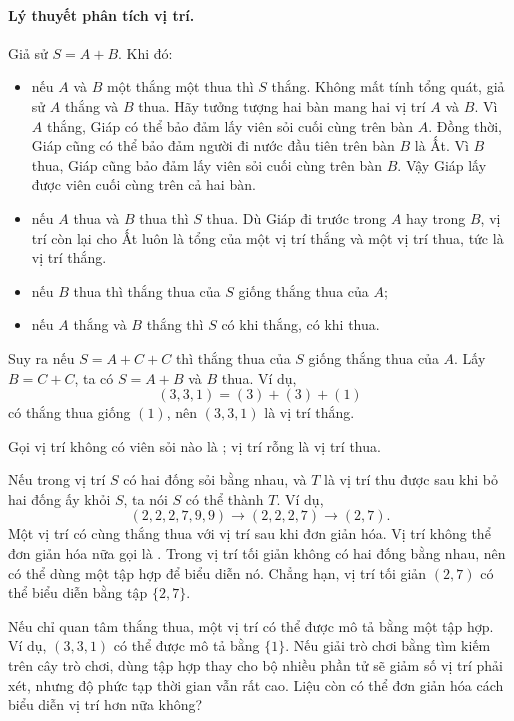 \documentclass[11pt]{article}
\begin{document}
\paragraph{Lý thuyết phân tích vị trí.}
Giả sử \(S=A+B\). Khi đó:
\begin{itemize}
  \item nếu \(A\) và \(B\) một thắng một thua thì \(S\) thắng. Không mất tính
  tổng quát, giả sử \(A\) thắng và \(B\) thua. Hãy tưởng tượng hai bàn mang
  hai vị trí \(A\) và \(B\). Vì \(A\) thắng, Giáp có thể bảo đảm lấy viên sỏi
  cuối cùng trên bàn \(A\). Đồng thời, Giáp cũng có thể bảo đảm người đi
  nước đầu tiên trên bàn \(B\) là Ất. Vì \(B\) thua, Giáp cũng bảo đảm lấy
  viên sỏi cuối cùng trên bàn \(B\). Vậy Giáp lấy được viên cuối cùng trên
  cả hai bàn.

  \item nếu \(A\) thua và \(B\) thua thì \(S\) thua. Dù Giáp đi trước trong
  \(A\) hay trong \(B\), vị trí còn lại cho Ất luôn là tổng của một vị trí
  thắng và một vị trí thua, tức là vị trí thắng.

  \item nếu \(B\) thua thì thắng thua của \(S\) giống thắng thua của \(A\);

  \item nếu \(A\) thắng và \(B\) thắng thì \(S\) có khi thắng, có khi thua.
\end{itemize}

Suy ra nếu \(S=A+C+C\) thì thắng thua của \(S\) giống thắng thua của \(A\).
Lấy \(B=C+C\), ta có \(S=A+B\) và \(B\) thua. Ví dụ,
\[
  (3,3,1)=(3)+(3)+(1)
\]
có thắng thua giống \((1)\), nên \((3,3,1)\) là vị trí thắng.

Gọi vị trí không có viên sỏi nào là ; vị trí rỗng là vị trí
thua.

Nếu trong vị trí \(S\) có hai đống sỏi bằng nhau, và \(T\) là vị trí thu
được sau khi bỏ hai đống ấy khỏi \(S\), ta nói \(S\) có thể  thành \(T\). Ví dụ,
\[
  (2,2,2,7,9,9)\to (2,2,2,7)\to (2,7).
\]
Một vị trí có cùng thắng thua với vị trí sau khi đơn giản hóa. Vị trí không
thể đơn giản hóa nữa gọi là . Trong vị trí tối giản
không có hai đống bằng nhau, nên có thể dùng một tập hợp để biểu diễn nó.
Chẳng hạn, vị trí tối giản \((2,7)\) có thể biểu diễn bằng tập \(\{2,7\}\).

Nếu chỉ quan tâm thắng thua, một vị trí có thể được mô tả bằng một tập hợp.
Ví dụ, \((3,3,1)\) có thể được mô tả bằng \(\{1\}\). Nếu giải trò chơi bằng
tìm kiếm trên cây trò chơi, dùng tập hợp thay cho bộ nhiều phần tử sẽ giảm
số vị trí phải xét, nhưng độ phức tạp thời gian vẫn rất cao. Liệu còn có thể
đơn giản hóa cách biểu diễn vị trí hơn nữa không?
\end{document}
